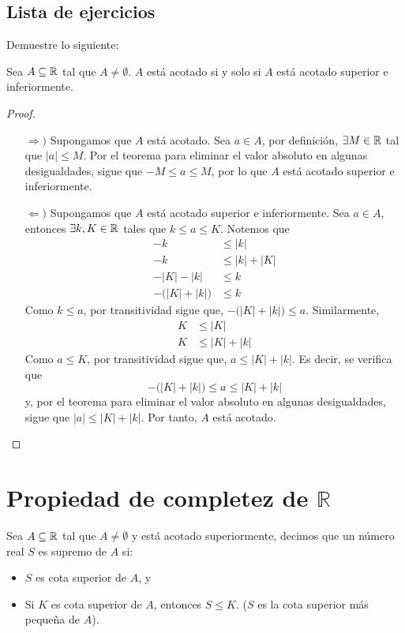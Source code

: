 \subsection*{Lista de ejercicios}

Demuestre lo siguiente:

Sea $A\subseteq \mathbb{R}$ tal que $A\neq \emptyset$. $A$ está acotado si y solo si $A$ está acotado superior e inferiormente.
 
 \begin{proof} \leavevmode
  \begin{itemize}
   \item[$\Rightarrow)$] Supongamos que $A$ está acotado. Sea $a\in A$, por definición, $\exists M\in \mathbb{R}$ tal que $|a|\leq M$. Por el teorema para eliminar el valor absoluto en algunas desigualdades, sigue que $-M\leq a \leq M$, por lo que $A$ está acotado superior e inferiormente.
   \item[$\Leftarrow)$] Supongamos que $A$ está acotado superior e inferiormente. Sea $a\in A$, entonces $\exists k, K\in \mathbb{R}$ tales que $k\leq a \leq K$. Notemos que
   \begin{align*}
    -k &\leq |k|\\
    -k &\leq |k| + |K|\\
    -|K|-|k| &\leq k\\
    - \big(|K|+|k|\big) &\leq k
   \end{align*}
   Como $k\leq a$, por transitividad sigue que, $-\big(|K|+|k|\big) \leq a$. Similarmente,
   \begin{align*}
    K &\leq |K|\\
    K &\leq |K| + |k|
   \end{align*}
   Como $a\leq K$, por transitividad sigue que, $a\leq |K|+|k|$. Es decir, se verifica que \[-\big(|K|+|k|\big) \leq a \leq |K|+|k|\]
   y, por el teorema para eliminar el valor absoluto en algunas desigualdades, sigue que $|a| \leq |K| + |k|$. Por tanto, $A$ está acotado. \qedhere
  \end{itemize}
 \end{proof}
 
 \section*{Propiedad de completez de \(\mathbb{R}\)}

  Sea $A\subseteq \mathbb{R}$ tal que $A\neq \emptyset$ y está acotado superiormente, decimos que un número real $S$ es supremo de $A$ si:
\begin{itemize}
 \item $S$ es cota superior de $A$, y
 \item Si $K$ es cota superior de $A$, entonces $S\leq K$. ($S$ es la cota superior más pequeña de $A$).
\end{itemize}

